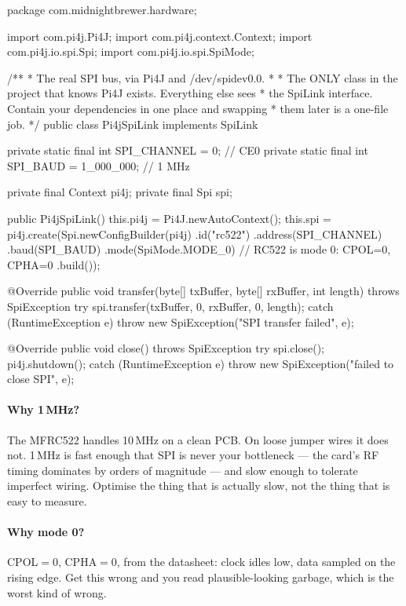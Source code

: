 \begin{jcode}
package com.midnightbrewer.hardware;

import com.pi4j.Pi4J;
import com.pi4j.context.Context;
import com.pi4j.io.spi.Spi;
import com.pi4j.io.spi.SpiMode;

/**
 * The real SPI bus, via Pi4J and /dev/spidev0.0.
 *
 * The ONLY class in the project that knows Pi4J exists. Everything else sees
 * the SpiLink interface. Contain your dependencies in one place and swapping
 * them later is a one-file job.
 */
public class Pi4jSpiLink implements SpiLink {

    private static final int SPI_CHANNEL = 0;         // CE0
    private static final int SPI_BAUD    = 1_000_000; // 1 MHz

    private final Context pi4j;
    private final Spi spi;

    public Pi4jSpiLink() {
        this.pi4j = Pi4J.newAutoContext();
        this.spi = pi4j.create(Spi.newConfigBuilder(pi4j)
                .id("rc522")
                .address(SPI_CHANNEL)
                .baud(SPI_BAUD)
                .mode(SpiMode.MODE_0)   // RC522 is mode 0: CPOL=0, CPHA=0
                .build());
    }

    @Override
    public void transfer(byte[] txBuffer, byte[] rxBuffer, int length)
            throws SpiException {
        try {
            spi.transfer(txBuffer, 0, rxBuffer, 0, length);
        } catch (RuntimeException e) {
            throw new SpiException("SPI transfer failed", e);
        }
    }

    @Override
    public void close() throws SpiException {
        try {
            spi.close();
            pi4j.shutdown();
        } catch (RuntimeException e) {
            throw new SpiException("failed to close SPI", e);
        }
    }
}
\end{jcode}

\paragraph{Why 1\,MHz?} The MFRC522 handles 10\,MHz on a clean PCB. On loose
jumper wires it does not. 1\,MHz is fast enough that SPI is never your bottleneck
--- the card's RF timing dominates by orders of magnitude --- and slow enough to
tolerate imperfect wiring. Optimise the thing that is actually slow, not the
thing that is easy to measure.

\paragraph{Why mode 0?} CPOL${}=0$, CPHA${}=0$, from the datasheet: clock idles
low, data sampled on the rising edge. Get this wrong and you read
plausible-looking garbage, which is the worst kind of wrong.

